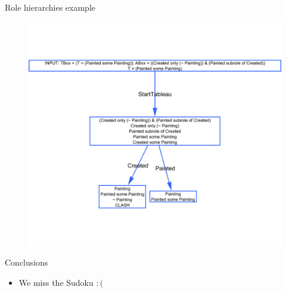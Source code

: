 \documentclass{beamer}
\begin{document}
\begin{frame}{Role hierarchies example}

\begin{figure}
\begin{center}
\includegraphics[scale=0.27]{premodelmetsubrole}
\end{center}
\end{figure}

\end{frame}



\begin{frame}{Conclusions}
\begin{itemize}
\item We miss the Sudoku $:($
\end{itemize}
 
\end{frame}
\end{document}
